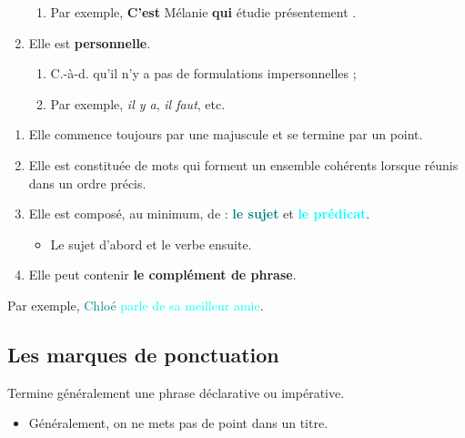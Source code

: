 \documentclass[10pt, french]{article}
\begin{document}
\begin{multicols*}{2}
\begin{definitionNOHFILLprop}
\begin{enumerate}
\begin{enumerate}
		\item	Par exemple, \og \textbf{C'est} Mélanie \textbf{qui} étudie présentement \fg{}.
		\end{enumerate}
	\item	Elle est \textbf{personnelle}.
		\begin{enumerate}
		\item	C.-à-d. qu'il n'y a pas de formulations impersonnelles ;
		\item	Par exemple, \textit{il y a}, \textit{il faut}, etc.
		\end{enumerate}
\end{enumerate}
\end{definitionNOHFILLprop}

\begin{definitionNOHFILLpropos}[Caractéristiques]
\begin{enumerate}
	\item	Elle commence toujours par une majuscule et se termine par un point.
	\item	Elle est constituée de mots qui forment un ensemble cohérents lorsque réunis dans un ordre précis.
	\item	Elle est composé, au minimum, de : \textbf{\textcolor{teal}{le sujet}} et \textbf{\textcolor{cyan}{le prédicat}}.
		\begin{itemize}
		\item	Le sujet d'abord et le verbe ensuite.
		\end{itemize}
	\item	Elle peut contenir \textbf{le complément de phrase}.
\end{enumerate}
\tcbline
Par exemple, \textcolor{teal}{Chloé} \textcolor{cyan}{parle de sa meilleur amie}.
\end{definitionNOHFILLpropos}


\columnbreak
\subsection{Les marques de ponctuation}
\begin{definitionNOHFILL}[Le point (.)]
Termine généralement une phrase déclarative ou impérative.\\

\begin{itemize}
	\item	Généralement, on ne mets pas de point dans un titre.
\end{itemize}
\end{definitionNOHFILL}


\end{multicols*}
\end{document}
